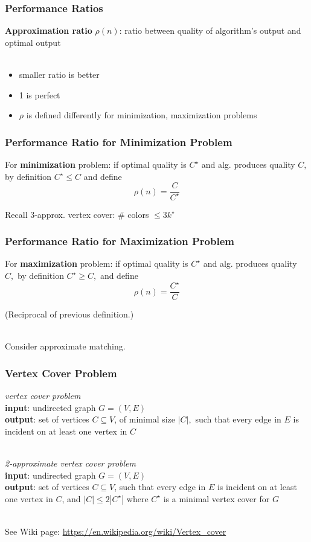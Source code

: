 \documentclass[10pt,aspectratio=169]{beamer}
\newcommand{\stanza}{ \\~\ }
\begin{document}
  \begin{frame} \frametitle{Performance Ratios}
  \textbf{Approximation ratio} $\rho(n)$: ratio between quality of algorithm's output
  and optimal output \stanza
  \begin{itemize}
    \item smaller ratio is better
    \item 1 is perfect
    \item $\rho$ is defined differently for minimization, maximization problems
  \end{itemize}
  \end{frame}
  
  \begin{frame} \frametitle{Performance Ratio for Minimization Problem}
    For \textbf{minimization} problem: if optimal quality is $C^\star$ and alg. produces
        quality $C,$ by definition $C^\star \leq C$ and define
        \[ \rho(n) = \frac{C}{C^\star} \]
    
    Recall 3-approx. vertex cover: \# colors $\leq 3 k^\star$
    \end{frame}
    
    \begin{frame} \frametitle{Performance Ratio for Maximization Problem}
  For \textbf{maximization} problem: if optimal quality is $C^\star$ and alg. produces
      quality $C,$ by definition $C^\star \geq C,$ and define
      \[ \rho(n) = \frac{C^\star}{C} \]
    
      (Reciprocal of previous definition.)
      \stanza
      
      Consider approximate matching.
  
    \end{frame}
    \begin{frame} \frametitle{Vertex Cover Problem}
      \emph{vertex cover problem} \\
      \textbf{input}: undirected graph $G=(V,E)$ \\
      \textbf{output}: set of vertices $C \subseteq V$, of minimal size $|C|,$ such
        that every edge in $E$ is incident on at least one vertex in $C$
       \stanza
      
       \emph{2-approximate vertex cover problem} \\
       \textbf{input}: undirected graph $G=(V,E)$ \\
       \textbf{output}: set of vertices $C \subseteq V$, such
         that every edge in $E$ is incident on at least one vertex in $C$, and
         $|C| \leq 2 |C^\star|$ where $C^\star$ is a minimal vertex cover for $G$
        \stanza
      
      See Wiki page: \url{https://en.wikipedia.org/wiki/Vertex_cover}
      \end{frame}
      
\end{document}
